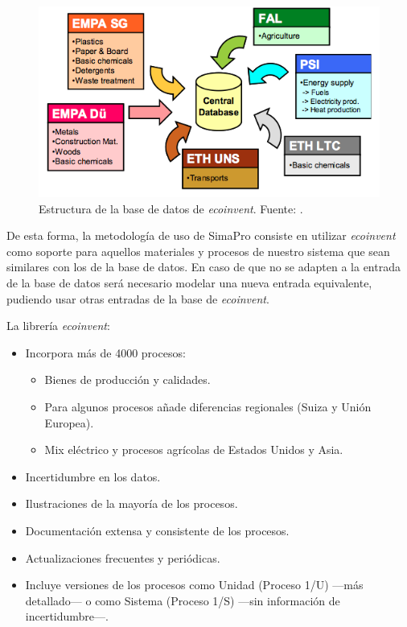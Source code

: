 \begin{figure}[!htb]
\centering
\includegraphics[width=15cm]{bbddecoinvent.png}
\caption[Estructura de la base de datos de \textit{ecoinvent}.]{Estructura de la base de datos de \textit{ecoinvent}. Fuente: \protect\cite{mgoedkoop2}.}
\label{fig:bbddecoinvent}
\end{figure}

De esta forma, la metodología de uso de SimaPro consiste en utilizar \textit{ecoinvent} como soporte para aquellos materiales y procesos de nuestro sistema que sean similares con los de la base de datos. En caso de que no se adapten a la entrada de la base de datos será necesario modelar una nueva entrada equivalente, pudiendo usar otras entradas de la base de \textit{ecoinvent}.

La librería \textit{ecoinvent}:
\begin{itemize}
  \item Incorpora más de 4000 procesos:
  \begin{itemize}
    \item Bienes de producción y calidades.
    \item Para algunos procesos añade diferencias regionales (Suiza y Unión Europea).
    \item Mix eléctrico y procesos agrícolas de Estados Unidos y Asia.
  \end{itemize}
  \item Incertidumbre en los datos.
  \item Ilustraciones de la mayoría de los procesos.
  \item Documentación extensa y consistente de los procesos.
  \item Actualizaciones frecuentes y periódicas.
  \item Incluye versiones de los procesos como Unidad (Proceso 1/U) —más detallado— o como Sistema (Proceso 1/S) —sin información de incertidumbre—.
\end{itemize}

